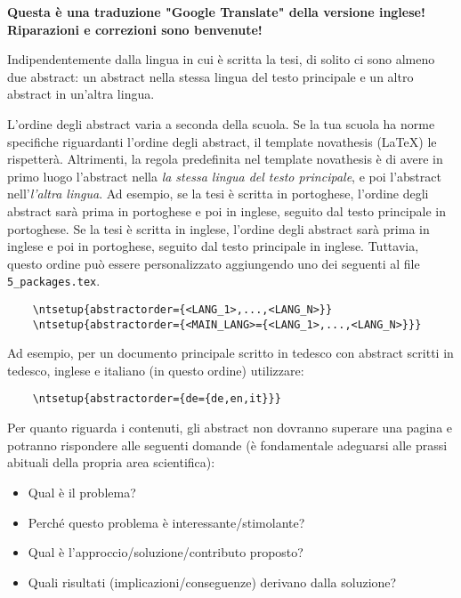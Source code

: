 
%


\textbf{Questa è una traduzione "Google Translate" della versione inglese! Riparazioni e correzioni sono benvenute!}

Indipendentemente dalla lingua in cui è scritta la tesi, di solito ci sono almeno due abstract: un abstract nella stessa lingua del testo principale e un altro abstract in un'altra lingua.

L'ordine degli abstract varia a seconda della scuola. Se la tua scuola ha norme specifiche riguardanti l'ordine degli abstract, il template \gls{novathesis} (\LaTeX) le rispetterà. Altrimenti, la regola predefinita nel template \gls{novathesis} è di avere in primo luogo l'abstract nella \emph{la stessa lingua del testo principale}, e poi l'abstract nell'\emph{l'altra lingua}. Ad esempio, se la tesi è scritta in portoghese, l'ordine degli abstract sarà prima in portoghese e poi in inglese, seguito dal testo principale in portoghese. Se la tesi è scritta in inglese, l'ordine degli abstract sarà prima in inglese e poi in portoghese, seguito dal testo principale in inglese.
%
Tuttavia, questo ordine può essere personalizzato aggiungendo uno dei seguenti al file \verb+5_packages.tex+.

\begin{verbatim}
    \ntsetup{abstractorder={<LANG_1>,...,<LANG_N>}}
    \ntsetup{abstractorder={<MAIN_LANG>={<LANG_1>,...,<LANG_N>}}}
\end{verbatim}

Ad esempio, per un documento principale scritto in tedesco con abstract scritti in tedesco, inglese e italiano (in questo ordine) utilizzare:
\begin{verbatim}
    \ntsetup{abstractorder={de={de,en,it}}}
\end{verbatim}

Per quanto riguarda i contenuti, gli abstract non dovranno superare una pagina e potranno rispondere alle seguenti domande (è fondamentale adeguarsi alle prassi abituali della propria area scientifica):

\begin{itemize}
  \item Qual è il problema?
  \item Perché questo problema è interessante/stimolante?
  \item Qual è l'approccio/soluzione/contributo proposto?
  \item Quali risultati (implicazioni/conseguenze) derivano dalla soluzione?
\end{itemize}

